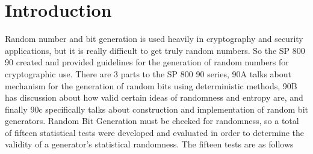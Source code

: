 \documentclass[11pt,letterpaper,conference]{IEEEtran}
\begin{document}
\section{Introduction}
Random number and bit generation is used heavily in cryptography and security applications, but it
is really difficult to get truly random numbers. So the SP 800 90 created and provided guidelines for
the generation of random numbers for cryptographic use. There are 3 parts to the SP 800 90 series,
90A talks about mechanism for the generation of random bits using deterministic methods, 90B
has discussion about how valid certain ideas of randomness and entropy are, and finally 90c
specifically talks about construction and implementation of random bit generators. Random Bit
Generation must be checked for randomness, so a total of fifteen statistical tests were developed
and evaluated in order to determine the validity of a generator’s statistical randomness. The fifteen
tests are as follows
\end{document}
